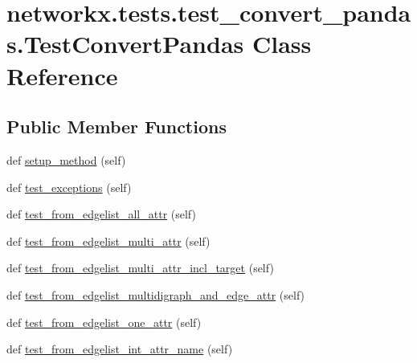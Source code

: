 \hypertarget{classnetworkx_1_1tests_1_1test__convert__pandas_1_1TestConvertPandas}{}\section{networkx.\+tests.\+test\+\_\+convert\+\_\+pandas.\+Test\+Convert\+Pandas Class Reference}
\label{classnetworkx_1_1tests_1_1test__convert__pandas_1_1TestConvertPandas}
\subsection*{Public Member Functions}
\begin{DoxyCompactItemize}
\item 
def \hyperlink{classnetworkx_1_1tests_1_1test__convert__pandas_1_1TestConvertPandas_af11e9e4f1b5a6585a3e52e28ea6d3941}{setup\+\_\+method} (self)
\item 
def \hyperlink{classnetworkx_1_1tests_1_1test__convert__pandas_1_1TestConvertPandas_a4bb504ed3af57cfe6c7849d5387808a3}{test\+\_\+exceptions} (self)
\item 
def \hyperlink{classnetworkx_1_1tests_1_1test__convert__pandas_1_1TestConvertPandas_aaa29aefa9c6e8596e68dacc5bbde1494}{test\+\_\+from\+\_\+edgelist\+\_\+all\+\_\+attr} (self)
\item 
def \hyperlink{classnetworkx_1_1tests_1_1test__convert__pandas_1_1TestConvertPandas_aa8d0610c518be1d9aec1838a5ab78456}{test\+\_\+from\+\_\+edgelist\+\_\+multi\+\_\+attr} (self)
\item 
def \hyperlink{classnetworkx_1_1tests_1_1test__convert__pandas_1_1TestConvertPandas_af33257dfa76cd54740b5b9b7e18e238b}{test\+\_\+from\+\_\+edgelist\+\_\+multi\+\_\+attr\+\_\+incl\+\_\+target} (self)
\item 
def \hyperlink{classnetworkx_1_1tests_1_1test__convert__pandas_1_1TestConvertPandas_ae122be96db988e726c65e61914aa5f55}{test\+\_\+from\+\_\+edgelist\+\_\+multidigraph\+\_\+and\+\_\+edge\+\_\+attr} (self)
\item 
def \hyperlink{classnetworkx_1_1tests_1_1test__convert__pandas_1_1TestConvertPandas_aea64d46588456570670afd553b0c7e0d}{test\+\_\+from\+\_\+edgelist\+\_\+one\+\_\+attr} (self)
\item 
def \hyperlink{classnetworkx_1_1tests_1_1test__convert__pandas_1_1TestConvertPandas_a6bce62870fe2dce85744777f1b412f62}{test\+\_\+from\+\_\+edgelist\+\_\+int\+\_\+attr\+\_\+name} (self)

\end{DoxyCompactItemize}
